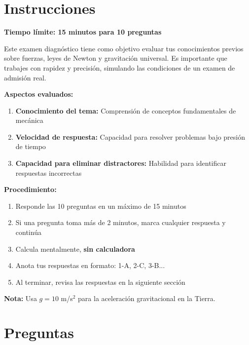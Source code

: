 \renewcommand{\tema}{Examen Diagnóstico - Fuerzas y Leyes de Newton}

\twocolumn
\section{Instrucciones}

\begin{instruccionbox}
\textbf{Tiempo límite: 15 minutos para 10 preguntas}

Este examen diagnóstico tiene como objetivo evaluar tus conocimientos previos sobre fuerzas, leyes de Newton y gravitación universal. Es importante que trabajes con rapidez y precisión, simulando las condiciones de un examen de admisión real.

\textbf{Aspectos evaluados:}
\begin{enumerate}
    \item \textbf{Conocimiento del tema:} Comprensión de conceptos fundamentales de mecánica
    \item \textbf{Velocidad de respuesta:} Capacidad para resolver problemas bajo presión de tiempo
    \item \textbf{Capacidad para eliminar distractores:} Habilidad para identificar respuestas incorrectas
\end{enumerate}

\textbf{Procedimiento:}
\begin{enumerate}
    \item Responde las 10 preguntas en un máximo de 15 minutos
    \item Si una pregunta toma más de 2 minutos, marca cualquier respuesta y continúa
    \item Calcula mentalmente, \textbf{sin calculadora}
    \item Anota tus respuestas en formato: 1-A, 2-C, 3-B...
    \item Al terminar, revisa las respuestas en la siguiente sección
\end{enumerate}

\textbf{Nota:} Usa $g = 10$ m/s$^2$ para la aceleración gravitacional en la Tierra.
\end{instruccionbox}

\section{Preguntas}

